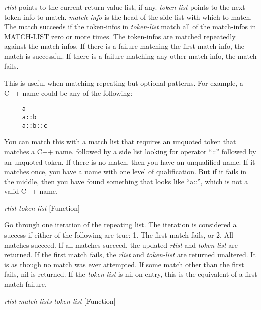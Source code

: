 \begin{doc-string}
\emph{rlist} points to the current return value list, if any.  \emph{token-list} points to
the next token-info to match.  \emph{match-info} is the head of the side list with
which to match.  The match succeeds if the token-infos in \emph{token-list} match all
of the match-infos in MATCH-LIST zero or more times.  The token-infos are
matched repeatedly against the match-infos.  If there is a failure matching the
first match-info, the match is successful.  If there is a failure matching any
other match-info, the match fails.

This is useful when matching repeating but optional patterns.  For example, a
C++ name could be any of the following:

\small{\begin{verbatim}
     a
     a::b
     a::b::c
\end{verbatim}}

You can match this with a match list that requires an unquoted token that
matches a C++ name, followed by a side list looking for operator ``::'' followed
by an unquoted token.  If there is no match, then you have an unqualified name.
If it matches once, you have a name with one level of qualification.  But if it
fails in the middle, then you have found something that looks like ``a::'',
which is not a valid C++ name.
\end{doc-string}

\vspace{1em}
\noindent
{}
\usebox{\funcname}\emph{rlist} \emph{token-list}
 \hfill [Function]
\hspace*{\wd\funcname}

\begin{doc-string}
Go through one iteration of the repeating list.  The iteration is considered
a success if either of the following are true: 1. The first match fails, or
2. All matches succeed.  If all matches succeed, the updated \emph{rlist} and
\emph{token-list} are returned.  If the first match fails, the \emph{rlist} and \emph{token-list} are
returned unaltered.  It is as though no match was ever attempted.  If some match
other than the first fails, nil is returned.  If the \emph{token-list} is nil on entry,
this is the equivalent of a first match failure.
\end{doc-string}

\vspace{1em}
\noindent
{}
\usebox{\funcname}\emph{rlist} \emph{match-lists} \emph{token-list}
 \hfill [Function]


